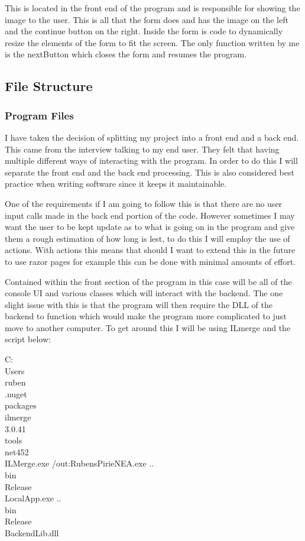 \begin{FlushLeft}
    This is located in the front end of the program and is responsible for showing the image to the user. This is all that the form does and has the image on the left and the continue button on the right. Inside the form is code to dynamically resize the elements of the form to fit the screen. The only function written by me is the nextButton which closes the form and resumes the program.

    \BK

    \subsection{File Structure}
    \subsubsection{Program Files}
    I have taken the decision of splitting my project into a front end and a back end. This came from the interview talking to my end user. They felt that having multiple different ways of interacting with the program. In order to do this I will separate the front end and the back end processing. This is also considered best practice when writing software since it keeps it maintainable. \\ \bk
    
    One of the requirements if I am going to follow this is that there are no user input calls made in the back end portion of the code. However sometimes I may want the user to be kept update as to what is going on in the program and give them a rough estimation of how long is lest, to do this I will employ the use of actions. With actions this means that should I want to extend this in the future to use razor pages for example this can be done with minimal amounts of effort. \\ \bk

    Contained within the front section of the program in this case will be all of the console UI and various classes which will interact with the backend. The one slight issue with this is that the program will then require the DLL of the backend to function which would make the program more complicated to just move to another computer. To get around this I will be using ILmerge and the script below:

    \begin{pseudocode}
C:\\Users\\ruben\\.nuget\\packages\\ilmerge\\3.0.41\\tools\\net452\\ILMerge.exe 
    /out:RubensPirieNEA.exe 
    ..\\bin\\Release\\LocalApp.exe 
    ..\\bin\\Release\\BackendLib.dll
    \end{pseudocode}


\end{FlushLeft}
